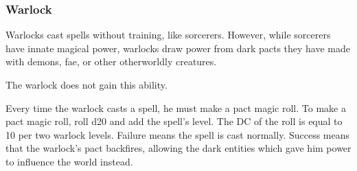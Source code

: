 \subsubsection{Warlock}

Warlocks cast spells without training, like sorcerers.
However, while sorcerers have innate magical power, warlocks draw power from dark pacts they have made with demons, fae, or other otherworldly creatures.

 The warlock does not gain this ability.

 Every time the warlock casts a spell, he must make a pact magic roll.
To make a pact magic roll, roll d20 and add the spell's level.
The DC of the roll is equal to 10  per two warlock levels.
Failure means the spell is cast normally.
Success means that the warlock's pact backfires, allowing the dark entities which gave him power to influence the world instead.

